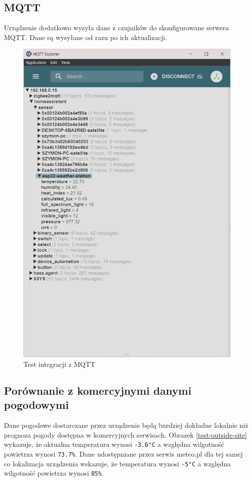 \documentclass[12pt,a4paper]{article}
\begin{document}
\subsection{MQTT}
Urządzenie dodatkowo wysyła dane z czujników do skonfigurowane serwera MQTT. Dane są wysyłane od razu po ich aktualizacji.
\begin{figure}[H]
    \centering
    \includegraphics[width=\textwidth]{mqtt1.png}
    \caption{Test integracji z MQTT}
\end{figure}

\subsection{Porównanie z komercyjnymi danymi pogodowymi}

Dane pogodowe dostarczane przez urządzenie będą bardziej dokładne lokalnie niż prognoza pogody dostępna 
w komercyjnych serwisach. Obrazek \ref{test-outside-site} wykazuje, że aktualna temperatura wynosi 
\texttt{-3.6°C} a względna wilgotność powietrza wynosi \texttt{73.7\%}. 
Dane udostępniane przez serwis meteo.pl \cite{meteopl-nysa} dla tej samej co lokalizacja urządzenia
wskazuje, że temperatura wynosi 
\texttt{-5°C} a względna wilgotność powietrza wynosi \texttt{85\%}.
\end{document}
